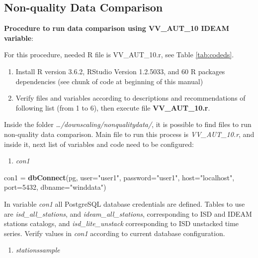 \documentclass[12pt,twoside]{reedthesis}
\newenvironment{Shaded}{\begin{snugshade}}{\end{snugshade}}
\newcommand{\DataTypeTok}[1]{\textcolor[rgb]{0.13,0.29,0.53}{#1}}
\newcommand{\DecValTok}[1]{\textcolor[rgb]{0.00,0.00,0.81}{#1}}
\newcommand{\KeywordTok}[1]{\textcolor[rgb]{0.13,0.29,0.53}{\textbf{#1}}}
\newcommand{\NormalTok}[1]{#1}
\newcommand{\StringTok}[1]{\textcolor[rgb]{0.31,0.60,0.02}{#1}}
\providecommand{\tightlist}{%
  \setlength{\itemsep}{0pt}\setlength{\parskip}{0pt}}
\begin{document}
\hypertarget{non-quality-data-comparison}{%
\subsection{Non-quality Data Comparison}\label{non-quality-data-comparison}}

\textbf{Procedure to run data comparison using VV\_AUT\_10 IDEAM variable}:

For this procedure, needed R file is VV\_AUT\_10.r, see Table \ref{tab:codeds}.
\begin{enumerate}
\def\labelenumi{\arabic{enumi}.}
\item
  Install R version 3.6.2, RStudio Version 1.2.5033, and 60 R packages dependencies (see chunk of code at beginning of this manual)
\item
  Verify files and variables according to descriptions and recommendations of following list (from 1 to 6), then execute file \textbf{VV\_AUT\_10.r}.
\end{enumerate}
Inside the folder \emph{\ldots/downscaling/nonqualitydata/}, it is possible to find files to run non-quality data comparison. Main file to run this process is \emph{VV\_AUT\_10.r}, and inside it, next list of variables and code need to be configured:
\begin{enumerate}
\def\labelenumi{\arabic{enumi}.}
\tightlist
\item
  \emph{con1}
\end{enumerate}
\scriptsize

\vspace{0.4cm}
\begin{Shaded}
\begin{Highlighting}[]
\NormalTok{      con1 =}\StringTok{ }\KeywordTok{dbConnect}\NormalTok{(pg, }\DataTypeTok{user=}\StringTok{"user1"}\NormalTok{, }\DataTypeTok{password=}\StringTok{"user1"}\NormalTok{, }\DataTypeTok{host=}\StringTok{"localhost"}\NormalTok{, }\DataTypeTok{port=}\DecValTok{5432}\NormalTok{, }\DataTypeTok{dbname=}\StringTok{"winddata"}\NormalTok{)}
\end{Highlighting}
\end{Shaded}
\normalsize

In variable \emph{con1} all PostgreSQL database credentials are defined. Tables to use are \emph{isd\_all\_stations}, and \emph{ideam\_all\_stations}, corresponding to ISD and IDEAM stations catalogs, and \emph{isd\_lite\_unstack} corresponding to ISD unstacked time series. Verify values in \emph{con1} according to current database configuration.
\begin{enumerate}
\def\labelenumi{\arabic{enumi}.}
\setcounter{enumi}{1}
\tightlist
\item
  \emph{stationssample}
\end{enumerate}
\scriptsize
\end{document}
